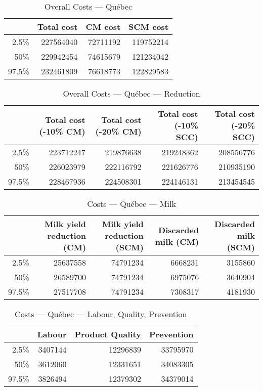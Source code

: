 \documentclass{article}\usepackage[]{graphicx}\usepackage[]{color}
\begin{document}
\begin{table}[ht]
\centering
\begin{tabular}{rrrr}
  \hline
 & Total cost & CM cost & SCM cost \\ 
  \hline
2.5\% & 227564040 & 72711192 & 119752214 \\ 
  50\% & 229942454 & 74615679 & 121234042 \\ 
  97.5\% & 232461809 & 76618773 & 122829583 \\ 
   \hline
\end{tabular}
\caption{Overall Costs --- Québec} 
\label{tab:quebec:overall}
\end{table}
\begin{table}[ht]
\centering
\begin{tabular}{rrrrr}
  \hline
 & Total cost (-10\% CM) & Total cost (-20\% CM) & Total cost (-10\% SCC) & Total cost (-20\% SCC) \\ 
  \hline
2.5\% & 223712247 & 219876638 & 219248362 & 208556776 \\ 
  50\% & 226023979 & 222116792 & 221626776 & 210935190 \\ 
  97.5\% & 228467936 & 224508301 & 224146131 & 213454545 \\ 
   \hline
\end{tabular}
\caption{Overall Costs --- Québec --- Reduction} 
\label{tab:quebec:reduction}
\end{table}
\begin{table}[ht]
\centering
\begin{tabular}{rrrrr}
  \hline
 & Milk yield reduction (CM) & Milk yield reduction (SCM) & Discarded milk (CM) & Discarded milk (SCM) \\ 
  \hline
2.5\% & 25637558 & 74791234 & 6668231 & 3155860 \\ 
  50\% & 26589700 & 74791234 & 6975076 & 3640904 \\ 
  97.5\% & 27517708 & 74791234 & 7308317 & 4181930 \\ 
   \hline
\end{tabular}
\caption{Costs --- Québec --- Milk} 
\label{tab:quebec:a}
\end{table}
\begin{table}[ht]
\centering
\begin{tabular}{rrrr}
  \hline
 & Labour & Product Quality & Prevention \\ 
  \hline
2.5\% & 3407144 & 12296839 & 33795970 \\ 
  50\% & 3612060 & 12331651 & 34083305 \\ 
  97.5\% & 3826494 & 12379302 & 34379014 \\ 
   \hline
\end{tabular}
\caption{Costs --- Québec --- Labour, Quality, Prevention} 
\label{tab:quebec:b}
\end{table}
\end{document}
